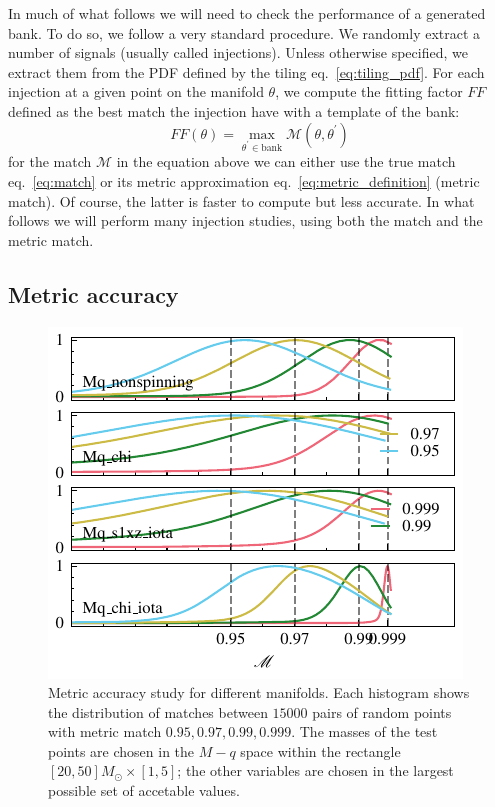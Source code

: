 \documentclass[twocolumn,showpacs,preprintnumbers,nofootinbib,prd,
superscriptaddress,10pt]{revtex4-2}
\begin{document}
In much of what follows we will need to check the performance of a generated bank. To do so, we follow a very standard procedure. We randomly extract a number of signals (usually called injections). Unless otherwise specified, we extract them from the PDF defined by the tiling eq.~\eqref{eq:tiling_pdf}.
For each injection at a given point on the manifold $\theta$, we compute the fitting factor $FF$ defined as the best match the injection have with a template of the bank:
\begin{equation}\label{eq:FF}
	FF(\theta) = \max_{\theta^\prime \in \text{bank}} \mathcal{M}(\theta, \theta^\prime)
\end{equation}
for the match $\mathcal{M}$ in the equation above we can either use the true match eq.~\eqref{eq:match} or its metric approximation eq.~\eqref{eq:metric_definition} (metric match).
Of course, the latter is faster to compute but less accurate. In what follows we will perform many injection studies, using both the match and the metric match.

\subsection{Metric accuracy} \label{sec:metric_accuracy}

\begin{figure}[t]
	\centering
	\includegraphics{metric_accuracy_hessian}
	\caption{Metric accuracy study for different manifolds.
	Each histogram shows the distribution of matches between $15000$ pairs of random points with metric match $0.95, 0.97, 0.99, 0.999$. The masses of the test points are chosen in the $M-q$ space within the rectangle ${[20, 50] M_\odot \times [1,5]}$; the other variables are chosen in the largest possible set of accetable values.}
	\label{fig:metric_accuracy}
\end{figure}
\end{document}
